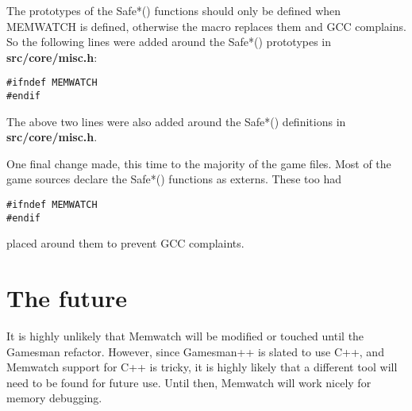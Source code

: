 \documentclass[11pt]{article}
\begin{document}
The prototypes of the Safe*() functions should only be defined when MEMWATCH is defined, otherwise the macro replaces them and GCC complains. So the following lines were added around the Safe*() prototypes in \textbf{src/core/misc.h}:
\begin{verbatim}
#ifndef MEMWATCH
#endif
\end{verbatim}

The above two lines were also added around the Safe*() definitions in \textbf{src/core/misc.h}.

One final change made, this time to the majority of the game files. Most of the game sources declare the Safe*() functions as externs. These too had 
\begin{verbatim}
#ifndef MEMWATCH
#endif
\end{verbatim}
placed around them to prevent GCC complaints.

\section{The future}
It is highly unlikely that Memwatch will be modified or touched until the Gamesman refactor. However, since Gamesman++ is slated to use C++, and Memwatch support for C++ is tricky, it is highly likely that a different tool will need to be found for future use. Until then, Memwatch will work nicely for memory debugging.
\end{document}
